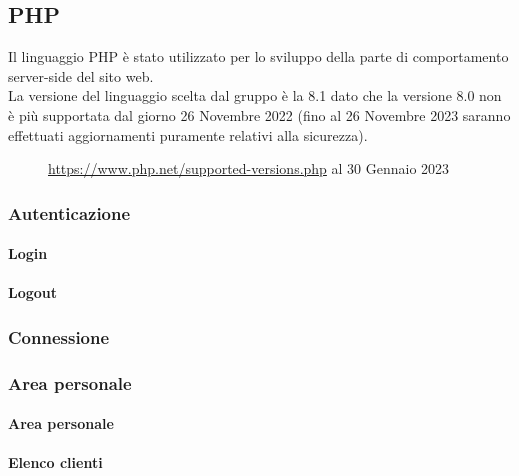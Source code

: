\documentclass[]{article}
\begin{document}
\subsection{PHP} %
Il linguaggio PHP è stato utilizzato per lo sviluppo della parte di comportamento server-side del sito web. \\
La versione del linguaggio scelta dal gruppo è la 8.1 dato che la versione 8.0 non è più supportata dal giorno 26 Novembre 2022 (fino al 26 Novembre 2023 saranno effettuati aggiornamenti puramente relativi alla sicurezza).
\begin{figure}[H]
	\centering
	\caption{\href{https://www.php.net/supported-versions.php}{https://www.php.net/supported-versions.php} al 30 Gennaio 2023}
\end{figure}

\subsubsection{Autenticazione}
\paragraph*{Login}
\paragraph*{Logout}

\subsubsection{Connessione}

\subsubsection{Area personale}
\paragraph*{Area personale}
\paragraph*{Elenco clienti}
\end{document}
